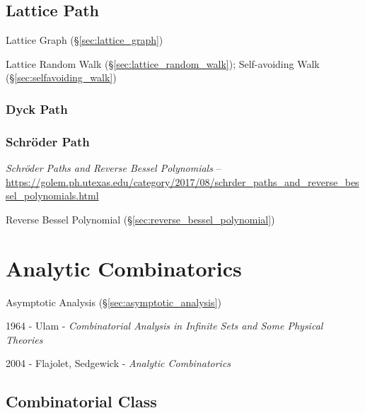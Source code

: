 \subsection{Lattice Path}\label{sec:lattice_path}

Lattice Graph (\S\ref{sec:lattice_graph})

\fist Lattice Random Walk (\S\ref{sec:lattice_random_walk}); Self-avoiding Walk
(\S\ref{sec:selfavoiding_walk})



\subsubsection{Dyck Path}\label{sec:dyck_path}

\subsubsection{Schr\"oder Path}\label{sec:schroder_path}

\emph{Schr\"oder Paths and Reverse Bessel Polynomials} --
\url{https://golem.ph.utexas.edu/category/2017/08/schrder_paths_and_reverse_bessel_polynomials.html}

Reverse Bessel Polynomial (\S\ref{sec:reverse_bessel_polynomial})



\section{Analytic Combinatorics}\label{sec:analytic_combinatorics}

\cite{flajolet-sedgewick09}

Asymptotic Analysis (\S\ref{sec:asymptotic_analysis})

1964 - Ulam - \emph{Combinatorial Analysis in Infinite Sets and Some Physical
  Theories}

2004 - Flajolet, Sedgewick - \emph{Analytic Combinatorics}



\subsection{Combinatorial Class}\label{sec:combinatorial_class}

